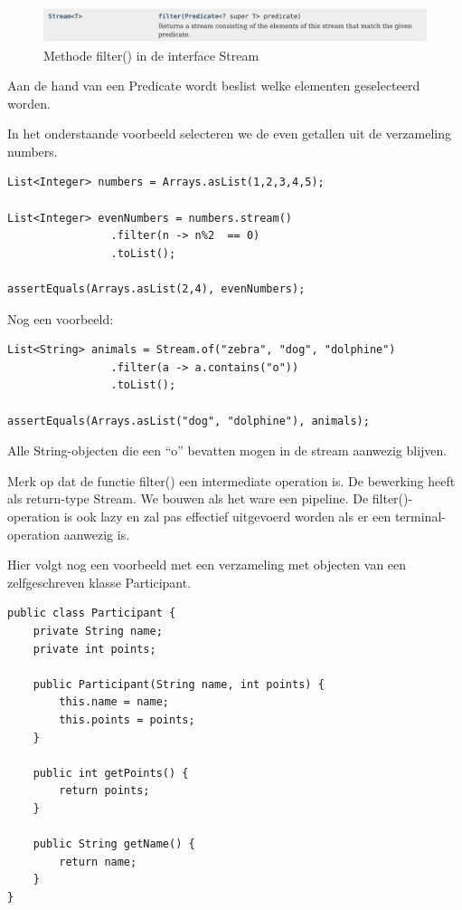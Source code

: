 \begin{figure}[H]
  \includegraphics[width=\linewidth]{images/h6/stream_filter.png}
  \caption{Methode filter() in de interface Stream}
  \label{fig:stream_filters}
\end{figure}

Aan de hand van een Predicate wordt beslist welke elementen geselecteerd worden. 

In het onderstaande voorbeeld selecteren we de even getallen uit de verzameling numbers.

\begin{lstlisting}
List<Integer> numbers = Arrays.asList(1,2,3,4,5);

List<Integer> evenNumbers = numbers.stream()
				.filter(n -> n%2  == 0)
				.toList();
				
assertEquals(Arrays.asList(2,4), evenNumbers);
\end{lstlisting}

Nog een voorbeeld:

\begin{lstlisting}
List<String> animals = Stream.of("zebra", "dog", "dolphine")
				.filter(a -> a.contains("o"))
				.toList();

assertEquals(Arrays.asList("dog", "dolphine"), animals);
\end{lstlisting}

Alle String-objecten die een ``o'' bevatten mogen in de stream aanwezig blijven.

Merk op dat de functie filter() een intermediate operation is. De bewerking heeft als return-type Stream. We bouwen als het ware een pipeline. De filter()-operation is ook lazy en zal pas effectief uitgevoerd worden als er een terminal-operation aanwezig is.

Hier volgt nog een voorbeeld met een verzameling met objecten van een zelfgeschreven klasse Participant.

\begin{lstlisting}
public class Participant {
	private String name;
	private int points;

	public Participant(String name, int points) {
		this.name = name;
		this.points = points;
	}

	public int getPoints() {
		return points;
	}

	public String getName() {
		return name;
	}
}
\end{lstlisting}

